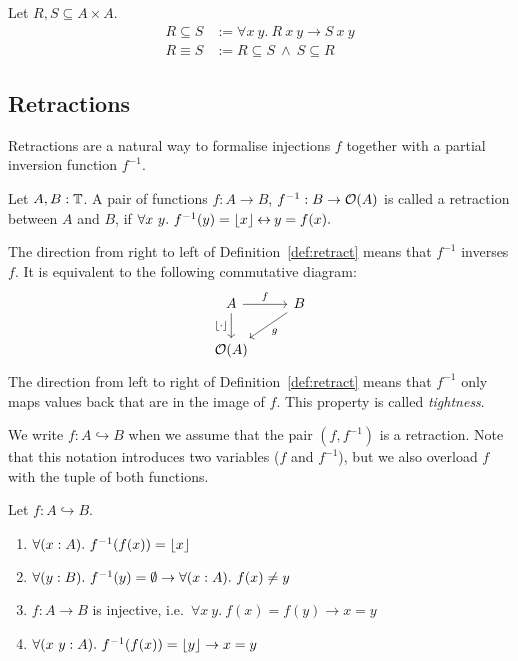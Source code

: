 \begin{definition}
  Let $R,S \subseteq A \times A$.
  \begin{align*}
    R \subseteq S &:= \forall x~y.~R~x~y \rightarrow S~x~y \\
    R \equiv S    &:= R \subseteq S ~\land~ S \subseteq R
  \end{align*}
\end{definition}


\subsection{Retractions}
\label{sec:retracts}

Retractions are a natural way to formalise injections $f$ together with a partial inversion function $f^{-1}$.

\begin{definition}[Retraction]
  \label{def:retract}
  Let $A, B : \mathbb{T}$.  A pair of functions $f : A \to B$, $f^{-1} : B \rightarrow \mathcal{O}(A)$ is called a retraction between $A$ and $B$, if
  $ \forall x~y.~f^{-1}(y) = \left\lfloor {x} \right\rfloor \mathbin{\leftrightarrow} y = f(x). $
\end{definition}

The direction from right to left of Definition~\ref{def:retract} means that $f^{-1}$ inverses $f$.  It is equivalent to the following commutative
diagram:
\[
  \begin{tikzcd}
    A \arrow[r, "f"] \arrow[d, "\Some \cdot", swap] & B \arrow[ld, "g"] \\
    \Option(A) &
  \end{tikzcd}
\]
The direction from left to right of Definition~\ref{def:retract} means that $f^{-1}$ only maps values back that are in the image of $f$.  This
property is called \textit{tightness}.

We write $f : A \hookrightarrow B$ when we assume that the pair $(f, f^{-1})$ is a retraction.  Note that this notation introduces two variables ($f$
and $f^{-1}$), but we also overload $f$ with the tuple of both functions.


\begin{lemma}
  \label{lem:retracts-basic}
  Let $f : A \hookrightarrow B$.
  \begin{enumerate}
  \item \label{lem:retract_g_adjoint}
    $\forall (x:A).~f^{-1}(f(x)) = \left\lfloor {x} \right\rfloor$
  \item \label{lem:retract_g_None}
    $\forall (y:B).~f^{-1}(y) = \emptyset \rightarrow \forall (x:A).~f(x) \neq y$
  \item \label{lem:retract_f_injective}
    $f : A \to B$ is injective, i.e.\ $\forall x~y.~f(x)=f(y) \rightarrow x=y$
  \item \label{lem:retract_g_Some}
    $\forall (x~y:A).~f^{-1}(f(x)) = \left\lfloor {y} \right\rfloor \rightarrow x=y$
  \end{enumerate}
\end{lemma}

